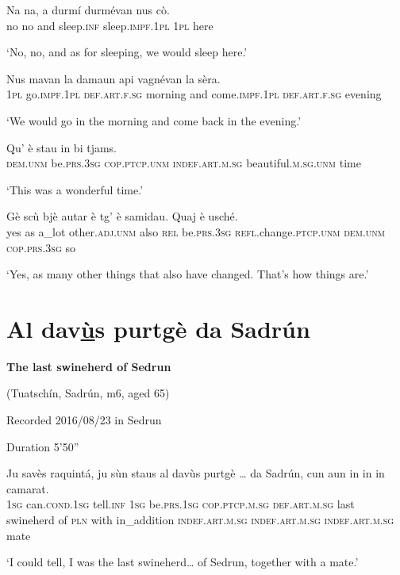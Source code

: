\begin{linenumbers}
\gll    Na na, a durmí durmévan nus cò. \\
no no and sleep.\textsc{inf} sleep.\textsc{impf.1pl} \textsc{1pl} here \\
\end{linenumbers}
\medskip
\glt `No, no, and as for sleeping, we would sleep here.'
\medskip

\begin{linenumbers}
\gll    Nus mavan la damaun api vagnévan la sèra. \\
 \textsc{1pl} go.\textsc{impf.1pl}  \textsc{def.art.f.sg} morning and come.\textsc{impf.1pl} \textsc{def.art.f.sg} evening \\
\end{linenumbers}
\medskip
\glt `We would go in the morning and come back in the evening.'
\medskip

\begin{linenumbers}
\gll    Qu’ è stau in bi tjams. \\
 \textsc{dem.unm} be.\textsc{prs.3sg} \textsc{cop.ptcp.unm} \textsc{indef.art.m.sg} beautiful.\textsc{m.sg.unm} time\\
\end{linenumbers}
\medskip
\glt `This was a wonderful time.'
\medskip

\begin{linenumbers}
\gll    Gè scù bjè autar è tg’ è samidau. Quaj è usché.\\
yes as a\_lot other.\textsc{adj.unm} also \textsc{rel} be.\textsc{prs.3sg} \textsc{refl.}change.\textsc{ptcp.unm}  \textsc{dem.unm} \textsc{cop.prs.3sg} so\\
\end{linenumbers}
\medskip
\glt `Yes, as many other things that also have changed. That’s how things are.'
\medskip

\section{Al dav\underline{ù}s purtgè da Sadrún}

\noindent
\textbf{The last swineherd of Sedrun}

\noindent
(Tuatschín, Sadrún, m6, aged 65)

\noindent
Recorded 2016/08/23 in Sedrun

\noindent
Duration 5'50''

\bigskip

\begin{linenumbers}
\gll    Ju savès raquintá, ju sùn staus al davùs purtgè … da Sadrún, cun aun in in in camarat.\\
 \textsc{1sg} can.\textsc{cond.1sg} tell.\textsc{inf} \textsc{1sg} be.\textsc{prs.1sg} \textsc{cop.ptcp.m.sg} \textsc{def.art.m.sg} last swineherd {} of \textsc{pln} with in\_addition  \textsc{indef.art.m.sg}  \textsc{indef.art.m.sg}  \textsc{indef.art.m.sg} mate\\
\end{linenumbers}
\medskip
\glt `I could tell, I was the last swineherd… of Sedrun, together with a mate.'
\medskip

